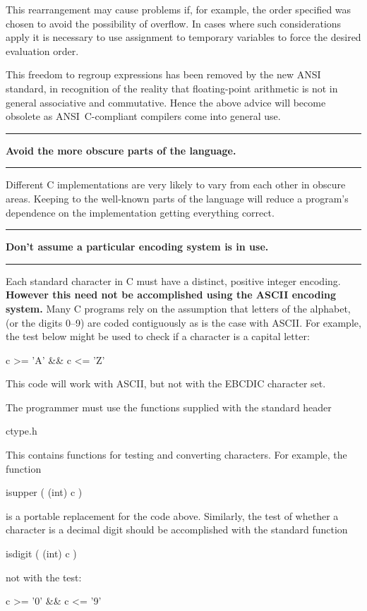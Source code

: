 \documentclass[twoside,11pt,nolof,noabs]{starlink}
\newcounter{sruleno}
\newcommand{\srule}[1]{
    \addtocounter{sruleno}{1}
    \goodbreak
    \rule{\textwidth}{0.3mm}
    \textbf{#1} \scpushright{\textbf{\thesruleno}}
    \rule{\textwidth}{0.1mm}
}
\begin{document}
This rearrangement may cause problems if, for example, the order
specified was chosen to avoid the possibility of overflow.
In cases where such considerations apply
it is necessary to use assignment to temporary variables to force the
desired evaluation order.


This freedom to regroup expressions has been removed by the
new ANSI standard, in
recognition of the reality that floating-point arithmetic is not in general
associative and commutative. Hence the above advice will become obsolete as
ANSI~C-compliant compilers come into general use.



\srule{Avoid the more obscure parts of the language.}
Different C implementations are very likely to vary from each other
in obscure areas.
Keeping to the well-known parts of the language will reduce a
program's dependence on the implementation getting everything correct.


\srule{Don't assume a particular encoding system is in use.}
Each standard character in C must have a distinct, positive integer encoding.
\textbf{However this need not be accomplished using the ASCII encoding system.}
Many C programs rely on the assumption that letters of the alphabet,
(or the digits 0--9) are coded contiguously as is the case with ASCII.
For example, the test below might be used to check if a character is
a capital letter:
\begin{terminalv}
      c >= 'A' && c <= 'Z'
\end{terminalv}
This code will work with ASCII, but not with the EBCDIC character set.

The programmer must use the functions supplied with the standard
header
\begin{terminalv}
      ctype.h
\end{terminalv}
This contains functions for testing and converting characters.  For example,
the function
\begin{terminalv}
      isupper ( (int) c )
\end{terminalv}
is a portable replacement for the code above.
Similarly, the test of whether a character is a decimal digit
should be accomplished with the standard function
\begin{terminalv}
      isdigit ( (int) c )
\end{terminalv}
not with the test:
\begin{terminalv}
      c >= '0' && c <= '9'
\end{terminalv}
\end{document}
